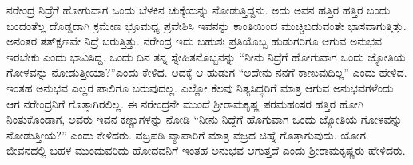 ನರೇಂದ್ರ ನಿದ್ರೆಗೆ ಹೋಗುವಾಗ ಒಂದು ಬೆಳಕಿನ ಚುಕ್ಕೆಯನ್ನು ನೋಡುತ್ತಿದ್ದನು. ಅದು ಅವನ ಹತ್ತಿರ ಹತ್ತಿರ ಬಂದು ಬಂದಂತೆಲ್ಲ ದೊಡ್ಡದಾಗಿ ಕ್ರಮೇಣ ಭ್ರೂಮಧ್ಯ ಪ್ರವೇಶಿಸಿ ಇವನನ್ನು ಕಾಂತಿಯಿಂದ ಮುಚ್ಚಿಬಿಡುವಂತೇ ಭಾಸವಾಗುತ್ತಿತ್ತು. ಅನಂತರ ತತ್‍ಕ್ಷಣವೇ ನಿದ್ರೆ ಬರುತ್ತಿತ್ತು. ನರೇಂದ್ರ ಇದು ಬಹುಶಃ ಪ್ರತಿಯೊಬ್ಬ ಹುಡುಗರಿಗೂ ಆಗುವ ಅನುಭವ ಇರಬೇಕು ಎಂದು ಭಾವಿಸಿದ್ದ. ಒಂದು ದಿನ ತನ್ನ ಸ್ನೇಹಿತನೊಬ್ಬನನ್ನು “ನೀನು ನಿದ್ರೆಗೆ ಹೋಗುವಾಗ ಒಂದು ಜ್ಯೋತಿಯ ಗೋಳವನ್ನು ನೋಡುತ್ತೀಯಾ?”ಎಂದು ಕೇಳಿದ. ಅದಕ್ಕೆ ಆ ಹುಡುಗ “ಅದೇನು ನನಗೆ ಕಾಣುವುದಿಲ್ಲ” ಎಂದು ಹೇಳಿದ. ಇಂತಹ ಅನುಭವ ಎಲ್ಲರ ಪಾಲಿಗೂ ಬರುವುದಲ್ಲ. ಎಲ್ಲೋ ಕೆಲವು ನಿತ್ಯಸಿದ್ಧರಿಗೆ ಮಾತ್ರ ಆಗುವ ಅನುಭವಗಳೆಂದು ಆಗ ನರೇಂದ್ರನಿಗೆ ಗೊತ್ತಾಗಿರಲಿಲ್ಲ. ಈ ನರೇಂದ್ರನೇ ಮುಂದೆ ಶ‍್ರೀರಾಮಕೃಷ್ಣ ಪರಮಹಂಸರ ಹತ್ತಿರ ಹೋಗಿ ನಿಂತುಕೊಂಡಾಗ, ಅವರು ಇವನ ಕಣ್ಣುಗಳನ್ನು ನೋಡಿ “ನೀನು ನಿದ್ದೆಗೆ ಹೊಗುವಾಗ ಒಂದು ಜ್ಯೋತಿಯ ಗೋಳವನ್ನು ನೋಡುತ್ತೀಯ?” ಎಂದು ಕೇಳಿದರು. ವಜ್ರಪಡಿ ವ್ಯಾಪಾರಿಗೆ ಮಾತ್ರ ವಜ್ರದ ಚಿಹ್ನೆ ಗೊತ್ತಾಗುವುದು. ಯೋಗ ಜೀವನದಲ್ಲಿ ಬಹಳ ಮುಂದುವರಿದು ಹೋದವನಿಗೆ ಇಂತಹ ಅನುಭವ ಆಗುತ್ತದೆ ಎಂದು ಶ‍್ರೀರಾಮಕೃಷ್ಣರು ಹೇಳಿದರು. 

